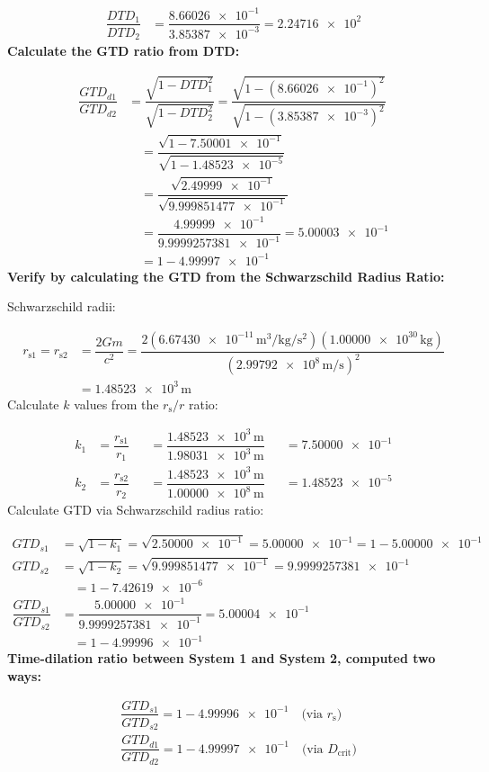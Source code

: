 \documentclass[twoside,twocolumn,9pt,fleqn]{article}
\begin{document}
\begin{mdframed}
\begin{align*}
\dfrac{DTD_1}{DTD_2} &= \dfrac{\num{8.66026e-1}}{\num{3.85387e-3}} = \num{2.24716e2}
\end{align*}
\noindent\textbf{Calculate the GTD ratio from DTD:}\par
\begin{align*}
\dfrac{GTD_{d1}}{GTD_{d2}} &= \dfrac{\sqrt{1-DTD_1^2}}{\sqrt{1-DTD_2^2}} = \dfrac{\sqrt{1-(\num{8.66026e-1})^2}}{\sqrt{1-(\num{3.85387e-3})^2}}\\
&\quad = \dfrac{\sqrt{1-\num{7.50001e-1}}}{\sqrt{1-\num{1.48523e-5}}}\\
&\quad = \dfrac{\sqrt{\num{2.49999e-1}}}{\sqrt{\num{9.999851477e-1}}}\\
&\quad = \dfrac{\num{4.99999e-1}}{\num{9.9999257381e-1}} = \num{5.00003e-1}\\
&\quad = 1-\num{4.99997e-1}
\end{align*}
\noindent\textbf{Verify by calculating the GTD from the Schwarzschild Radius Ratio:}\par
\noindent Schwarzschild radii:\par
\begin{align*}
r_{\mathrm{s}1} = r_{\mathrm{s}2} &= \dfrac{2Gm}{c^2} = \dfrac{2(\num{6.67430e-11}\,\unit{\meter\cubed\per\kilogram\per\second\squared})(\num{1.00000e30}\,\unit{\kilogram})}{(\num{2.99792e8}\,\unit{\meter\per\second})^2}\\
&= \num{1.48523e3}\,\unit{\meter}
\end{align*}
\noindent Calculate $k$ values from the $r_{\mathrm{s}}/r$ ratio:\par
\begin{align*}
k_1 &= \dfrac{r_{\mathrm{s}1}}{r_1} &&= \dfrac{\num{1.48523e3}\,\unit{\meter}}{\num{1.98031e3}\,\unit{\meter}} &&= \num{7.50000e-1}\\
k_2 &= \dfrac{r_{\mathrm{s}2}}{r_2} &&= \dfrac{\num{1.48523e3}\,\unit{\meter}}{\num{1.00000e8}\,\unit{\meter}} &&= \num{1.48523e-5}
\end{align*}
\noindent Calculate GTD via Schwarzschild radius ratio:\par
\begin{align*}
GTD_{s1} &= \sqrt{1-k_1} = \sqrt{\num{2.50000e-1}} = \num{5.00000e-1} = 1-\num{5.00000e-1}\\
GTD_{s2} &= \sqrt{1-k_2} = \sqrt{\num{9.999851477e-1}} = \num{9.9999257381e-1}\\
&\quad = 1-\num{7.42619e-6}\\
\dfrac{GTD_{s1}}{GTD_{s2}} &= \dfrac{\num{5.00000e-1}}{\num{9.9999257381e-1}} = \num{5.00004e-1}\\
&\quad = 1-\num{4.99996e-1}
\end{align*}
\noindent\textbf{Time-dilation ratio between System 1 and System 2, computed two ways:}\par
\begin{align*}
&\dfrac{GTD_{s1}}{GTD_{s2}} = 1-\num{4.99996e-1} \quad \text{(via $r_{\mathrm{s}}$)}\\
&\dfrac{GTD_{d1}}{GTD_{d2}} = 1-\num{4.99997e-1} \quad \text{(via $D_{\mathrm{crit}}$)}
\end{align*}
\end{mdframed}
\end{document}
